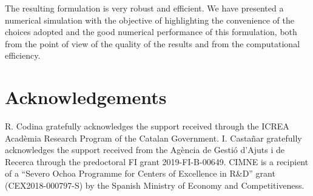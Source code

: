 \documentclass[11pt,a4paper,oneside,reqno]{amsart}
\begin{document}
The resulting formulation is very robust and efficient. We have presented a numerical simulation with the objective of highlighting the convenience of the choices adopted and the good numerical performance of this formulation, both from the point of view of the quality of the results and from the computational efficiency. 

\section*{Acknowledgements}

R. Codina gratefully acknowledges the support received through the ICREA Acad\`emia Research Program of the Catalan Government. 
I. Casta\~nar gratefully acknowledges the support received from the Ag\`encia de Gesti\'o d'Ajuts i de Recerca through the predoctoral FI grant 2019-FI-B-00649.
CIMNE is a recipient of a ``Severo Ochoa Programme for Centers of Excellence in R\&D'' grant (CEX2018-000797-S) by the Spanish Ministry of Economy and Competitiveness.
   

%

\end{document}
